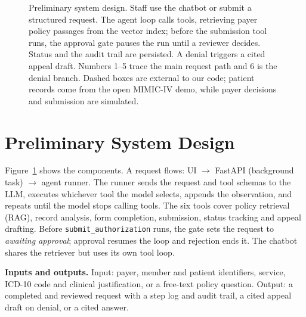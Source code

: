 \documentclass[final]{cvpr}
\begin{document}
\begin{figure}[t]
{}
\caption{Preliminary system design. Staff use the chatbot or submit a structured request. The agent loop calls tools, retrieving payer policy passages from the vector index; before the submission tool runs, the approval gate pauses the run until a reviewer decides. Status and the audit trail are persisted. A denial triggers a cited appeal draft. Numbers 1--5 trace the main request path and 6 is the denial branch. Dashed boxes are external to our code; patient records come from the open MIMIC-IV demo, while payer decisions and submission are simulated.}
\label{fig:system}
\end{figure}

\section{Preliminary System Design}
Figure~\ref{fig:system} shows the components. A request flows: UI $\to$ FastAPI (background task) $\to$ agent runner. The runner sends the request and tool schemas to the LLM, executes whichever tool the model selects, appends the observation, and repeats until the model stops calling tools. The six tools cover policy retrieval (RAG), record analysis, form completion, submission, status tracking and appeal drafting. Before \texttt{submit\_authorization} runs, the gate sets the request to \emph{awaiting approval}; approval resumes the loop and rejection ends it. The chatbot shares the retriever but uses its own tool loop.

\textbf{Inputs and outputs.} Input: payer, member and patient identifiers, service, ICD-10 code and clinical justification, or a free-text policy question. Output: a completed and reviewed request with a step log and audit trail, a cited appeal draft on denial, or a cited answer.
\end{document}
